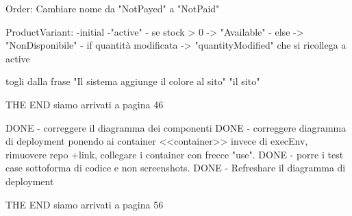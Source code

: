Order:
Cambiare nome da "NotPayed" a "NotPaid"

ProductVariant:
-initial
-"active"
- se stock > 0 -> "Available"
- else -> "NonDisponibile"
- if quantità modificata -> "quantityModified" che si ricollega a active





togli dalla frase "Il sistema aggiunge il colore al sito" "il sito"


THE END
siamo arrivati a pagina 46 

DONE - correggere il diagramma dei componenti
DONE - correggere diagramma di deployment ponendo ai container <<container>> invece di execEnv, rimuovere repo +link, collegare i container con frecce "use".
DONE - porre i test case sottoforma di codice e non screenshots.
DONE - Refreshare il diagramma di deployment


THE END
siamo arrivati a pagina 56 